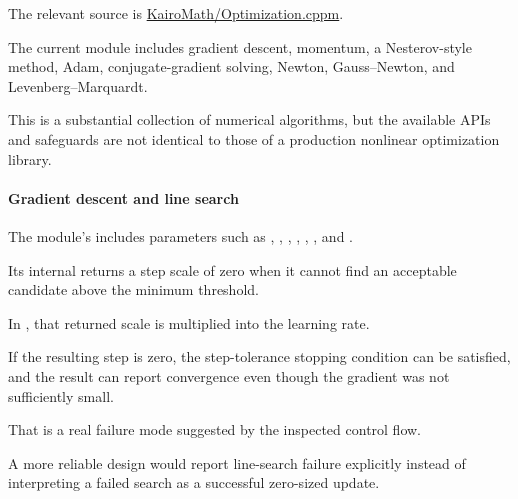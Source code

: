 The relevant source is \href{https://github.com/swayam8624/KairoMath/blob/master/Optimization.cppm?utm_source=chatgpt.com}{KairoMath/Optimization.cppm}.

The current module includes gradient descent, momentum, a Nesterov-style method, Adam, conjugate-gradient solving, Newton, Gauss--Newton, and Levenberg--Marquardt.

This is a substantial collection of numerical algorithms, but the available APIs and safeguards are not identical to those of a production nonlinear optimization library.

\paragraph{Gradient descent and line search}\label{02-foundations-ii-ch028-gradient-descent-and-line-search}

\hypertarget{02-foundations-ii-ch028-gradient-descent-and-line-search}{}

The module's  includes parameters such as , , , , , , and .

Its internal  returns a step scale of zero when it cannot find an acceptable candidate above the minimum threshold.

In , that returned scale is multiplied into the learning rate.

If the resulting step is zero, the step-tolerance stopping condition can be satisfied, and the result can report convergence even though the gradient was not sufficiently small.

That is a real failure mode suggested by the inspected control flow.

A more reliable design would report line-search failure explicitly instead of interpreting a failed search as a successful zero-sized update.

